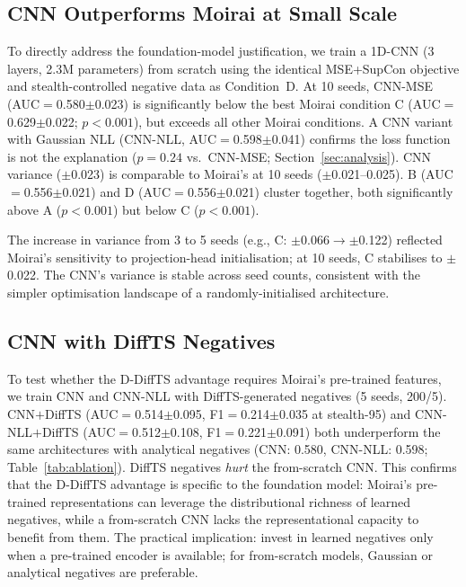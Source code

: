\subsection{CNN Outperforms Moirai at Small Scale}
\label{app:cnn_detail}

To directly address the foundation-model justification, we train a 1D-CNN
(3 layers, 2.3M parameters) from scratch using the identical MSE+SupCon
objective and stealth-controlled negative data as Condition~D.
At 10 seeds, CNN-MSE (AUC$=$0.580$\pm$0.023) is significantly below the best
Moirai condition C (AUC$=$0.629$\pm$0.022; $p{<}0.001$), but exceeds all other
Moirai conditions.
A CNN variant with Gaussian NLL (CNN-NLL, AUC$=$0.598$\pm$0.041) confirms the
loss function is not the explanation ($p{=}0.24$ vs.\ CNN-MSE;
Section~\ref{sec:analysis}).
CNN variance ($\pm$0.023) is comparable to Moirai's at 10 seeds ($\pm$0.021--0.025).
B (AUC$=$0.556$\pm$0.021) and D (AUC$=$0.556$\pm$0.021) cluster together,
both significantly above A ($p{<}0.001$) but below C ($p{<}0.001$).

The increase in variance from 3 to 5 seeds (e.g., C: $\pm$0.066$\to$$\pm$0.122)
reflected Moirai's sensitivity to projection-head initialisation;
at 10 seeds, C stabilises to $\pm$0.022.
The CNN's variance is stable across seed counts, consistent with
the simpler optimisation landscape of a randomly-initialised architecture.

\subsection{CNN with DiffTS Negatives}
\label{app:cnn_diffts}

To test whether the D-DiffTS advantage requires Moirai's pre-trained features,
we train CNN and CNN-NLL with DiffTS-generated negatives (5 seeds, 200/5).
CNN$+$DiffTS (AUC$=$0.514$\pm$0.095, F1$=$0.214$\pm$0.035 at stealth-95)
and CNN-NLL$+$DiffTS (AUC$=$0.512$\pm$0.108, F1$=$0.221$\pm$0.091)
both underperform the same architectures with analytical negatives
(CNN: 0.580, CNN-NLL: 0.598; Table~\ref{tab:ablation}).
DiffTS negatives \emph{hurt} the from-scratch CNN.
This confirms that the D-DiffTS advantage is specific to the foundation model:
Moirai's pre-trained representations can leverage the distributional richness
of learned negatives, while a from-scratch CNN lacks the representational
capacity to benefit from them.
The practical implication: invest in learned negatives only when a
pre-trained encoder is available; for from-scratch models, Gaussian or
analytical negatives are preferable.

